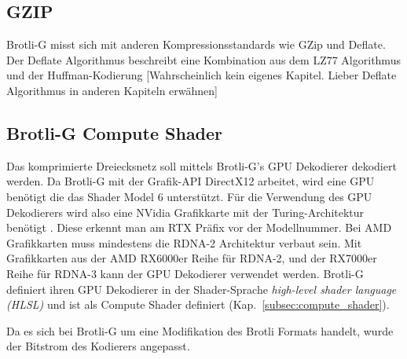 \subsection{GZIP}
\label{subsec:gzip}
Brotli-G misst sich mit anderen Kompressionsstandards wie GZip und Deflate.
Der Deflate Algorithmus beschreibt eine Kombination aus dem LZ77 Algorithmus und der Huffman-Kodierung
[Wahrscheinlich kein eigenes Kapitel. Lieber Deflate Algorithmus in anderen Kapiteln erwähnen]

\subsection{Brotli-G Compute Shader}
\label{subsec:brotlig_compute}
Das komprimierte Dreiecksnetz soll mittels Brotli-G's GPU Dekodierer dekodiert werden.
Da Brotli-G mit der Grafik-API DirectX12 arbeitet, wird eine GPU benötigt die das Shader Model 6 unterstützt.
Für die Verwendung des GPU Dekodierers wird also eine NVidia Grafikkarte mit der Turing-Architektur benötigt \cite{Burgess2020}.
Diese erkennt man am RTX Präfix vor der Modellnummer.
Bei AMD Grafikkarten muss mindestens die RDNA-2 Architektur verbaut sein.
Mit Grafikkarten aus der AMD RX6000er Reihe für RDNA-2, und der RX7000er Reihe für RDNA-3 kann der GPU Dekodierer verwendet werden.
Brotli-G definiert ihren GPU Dekodierer in der Shader-Sprache \textit{high-level shader language (HLSL)} und ist als Compute Shader definiert (Kap.~\ref{subsec:compute_shader}). \newline

Da es sich bei Brotli-G um eine Modifikation des Brotli Formats handelt, wurde der Bitstrom des Kodierers angepasst.

